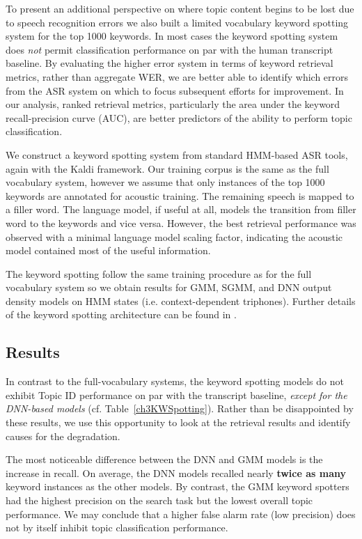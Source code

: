 To present an additional perspective on where topic content begins to be lost due to speech recognition errors we also built a limited vocabulary keyword spotting system for the top 1000 keywords.  In most cases the keyword spotting system does \textit{not} permit classification performance on par with the human transcript baseline.  By evaluating the higher error system in terms of keyword retrieval metrics, rather than aggregate WER, we are better able to identify which errors from the ASR system on which to focus subsequent efforts for improvement.  In our analysis, ranked retrieval metrics, particularly the area under the keyword recall-precision curve (AUC), are better predictors of the ability to perform topic classification.

We construct a keyword spotting system from standard HMM-based ASR tools, again with the Kaldi framework.  Our training corpus is the same as the full vocabulary system, however we assume that only instances of the top 1000 keywords are annotated for acoustic training.  The remaining speech is mapped to a filler word.  The language model, if useful at all, models the transition from filler word to the keywords and vice versa.  However, the best retrieval performance was observed with a minimal language model scaling factor, indicating the acoustic model contained most of the useful information.  

The keyword spotting follow the same training procedure as for the full vocabulary system so we obtain results for GMM, SGMM, and DNN output density models on HMM states (i.e. context-dependent triphones).   Further details of the keyword spotting architecture can be found in \cite{wintrode2014}.

\subsection{Results}
In contrast to the full-vocabulary systems, the keyword spotting models do not exhibit Topic ID performance on par with the transcript baseline, \emph{except for the DNN-based models} (cf. Table~\ref{ch3KWSpotting}).  Rather than be disappointed by these results, we use this opportunity to look at the retrieval results and identify causes for the degradation.

The most noticeable difference between the DNN and GMM models is the increase in recall.  On average, the DNN models recalled nearly \textbf{twice as many} keyword instances as the other models.  By contrast, the GMM keyword spotters had the highest precision on the search task but the lowest overall topic performance.  We may conclude that a higher false alarm rate (low precision) does not by itself inhibit topic classification performance.

